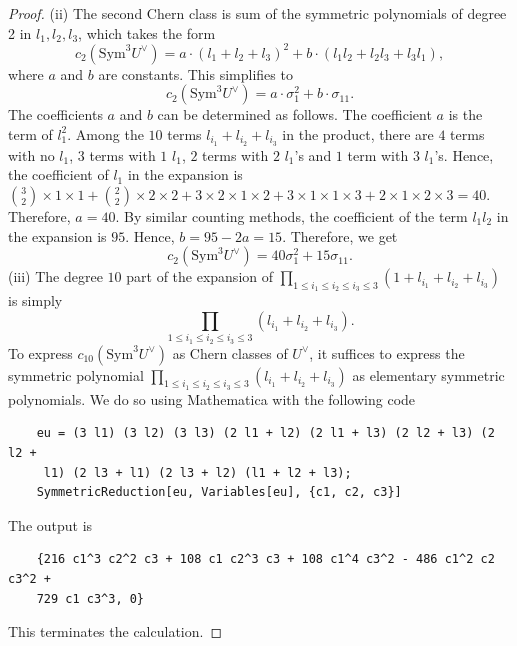 \documentclass{article}
\theoremstyle{definition}
\begin{document}
\begin{proof}
(ii) The second Chern class is sum of the symmetric polynomials of degree 2 in \(l_1, l_2, l_3\), which takes the form
\[
c_2(\mathrm{Sym}^3 U^\vee) = a \cdot (l_1 + l_2 + l_3)^2 + b \cdot (l_1 l_2 + l_2 l_3 + l_3 l_1),
\]
where \(a\) and \(b\) are constants. This simplifies to
\[
c_2(\mathrm{Sym}^3 U^\vee) = a \cdot \sigma_1^2 + b \cdot \sigma_{11}.
\]
The coefficients $a$ and $b$ can be determined as follows. The coefficient $a$ is the term of $l_1^2$. Among the $10$ terms $l_{i_1} + l_{i_2} + l_{i_3}$ in the product, there are $4$ terms with no $l_1$, $3$ terms with $1$ $l_1$, $2$ terms with $2$ $l_1$’s and $1$ term with $3$ $l_1$’s. Hence, the coefficient of $l_1$ in the expansion is $\binom{3}{2}\times 1\times 1 + \binom{2}{2}\times 2\times 2  + 3\times 2\times 1\times 2 + 3\times 1\times 1\times 3 + 2\times 1\times 2\times 3 = 40$. Therefore, $a = 40$. By similar counting methods, the coefficient of the term $l_1l_2$ in the expansion is $95$. Hence, $b = 95 - 2a = 15$. Therefore, we get
\[
c_2(\mathrm{Sym}^3 U^\vee) = 40 \sigma_1^2 + 15 \sigma_{11}.
\]
(iii)
The degree $10$ part of the expansion of $\prod_{1 \leq i_1 \leq i_2 \leq i_3 \leq 3} (1 + l_{i_1} + l_{i_2} + l_{i_3})$ is simply 
\[
\prod_{1\leq i_1\leq i_2\leq i_3\leq 3}(l_{i_1} + l_{i_2} + l_{i_3}).
\]
To express $c_{10}(\mathrm{Sym}^3U^\vee)$ as Chern classes of $U^\vee$, it suffices to express the symmetric polynomial $\prod_{1\leq i_1\leq i_2\leq i_3\leq 3}(l_{i_1} + l_{i_2} + l_{i_3})$ as elementary symmetric polynomials. We do so using Mathematica with the following code
\begin{verbatim}
    eu = (3 l1) (3 l2) (3 l3) (2 l1 + l2) (2 l1 + l3) (2 l2 + l3) (2 l2 + 
     l1) (2 l3 + l1) (2 l3 + l2) (l1 + l2 + l3);
    SymmetricReduction[eu, Variables[eu], {c1, c2, c3}]
\end{verbatim}
The output is
\begin{verbatim}
    {216 c1^3 c2^2 c3 + 108 c1 c2^3 c3 + 108 c1^4 c3^2 - 486 c1^2 c2 c3^2 + 
    729 c1 c3^3, 0}
\end{verbatim}
This terminates the calculation.
\end{proof}
\end{document}
